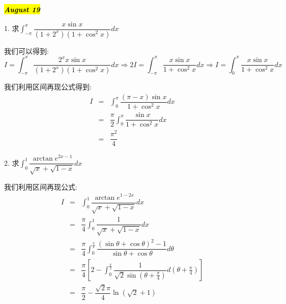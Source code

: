 \hl{\textbf{\textit{August 19}}}

1. 求$\int_{-\pi}^{\pi}\dfrac{x\sin x}{(1+2^x)(1+\cos^2 x)}dx$
\begin{solution}

	我们可以得到:  
	$$I=\int_{-\pi}^{\pi}\dfrac{2^xx\sin x}{(1+2^x)(1+\cos^2 x)}dx\Rightarrow 2I=\int_{-\pi}^{\pi}\dfrac{x\sin x}{1+\cos^2 x}dx\Rightarrow I=\int_{0}^{\pi}\dfrac{x\sin x}{1+\cos^2 x}dx$$
	
	我们利用区间再现公式得到:  
	\begin{eqnarray*}
		I&=&\int_{0}^{\pi}\dfrac{(\pi-x)\sin x}{1+\cos^2 x}dx\\
		&=&\dfrac{\pi}{2}\int_{0}^{\pi}\dfrac{\sin x}{1+\cos^2 x}dx\\
		&=&\dfrac{\pi^2}{4}
	\end{eqnarray*}
\end{solution}

2. 求$\int_{0}^{1}\dfrac{\arctan e^{2x-1}}{\sqrt{x}+\sqrt{1-x}}dx$
\begin{solution}

	我们利用区间再现公式:  
	\begin{eqnarray*}
		I&=&\int_{0}^{1}\dfrac{\arctan e^{1-2x}}{\sqrt{x}+\sqrt{1-x}}dx\\
		&=&\dfrac{\pi}{4}\int_{0}^{1}\dfrac{1}{\sqrt{x}+\sqrt{1-x}}dx\\
		&=&\dfrac{\pi}{4}\int_{0}^{\frac{\pi}{2}}\dfrac{(\sin\theta+\cos\theta)^2-1}{\sin \theta+\cos\theta}d\theta\\
		&=&\dfrac{\pi}{4}\left[ 2-\int_{0}^{\frac{\pi}{2}}\dfrac{1}{\sqrt{2}\sin(\theta+\frac{\pi}{4})}d(\theta+\frac{\pi}{4})\right]\\
		&=&\dfrac{\pi}{2}-\dfrac{\sqrt{2}\pi}{4}\ln(\sqrt{2}+1) 
	\end{eqnarray*}
\end{solution}

